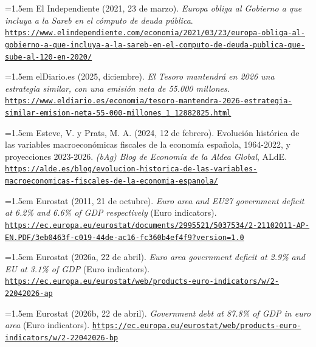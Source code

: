 \documentclass[10pt,a4paper]{article}
\begin{document}
\noindent\hangindent=1.5em El Independiente (2021, 23 de marzo). \textit{Europa obliga al Gobierno a que incluya a la Sareb en el cómputo de deuda pública}. \href{https://www.elindependiente.com/economia/2021/03/23/europa-obliga-al-gobierno-a-que-incluya-a-la-sareb-en-el-computo-de-deuda-publica-que-sube-al-120-en-2020/}{\nolinkurl{https://www.elindependiente.com/economia/2021/03/23/europa-obliga-al-gobierno-a-que-incluya-a-la-sareb-en-el-computo-de-deuda-publica-que-sube-al-120-en-2020/}}

\noindent\hangindent=1.5em elDiario.es (2025, diciembre). \textit{El Tesoro mantendrá en 2026 una estrategia similar, con una emisión neta de 55.000 millones}. \href{https://www.eldiario.es/economia/tesoro-mantendra-2026-estrategia-similar-emision-neta-55-000-millones_1_12882825.html}{\nolinkurl{https://www.eldiario.es/economia/tesoro-mantendra-2026-estrategia-similar-emision-neta-55-000-millones_1_12882825.html}}

\noindent\hangindent=1.5em Esteve, V. y Prats, M. A. (2024, 12 de febrero). Evolución histórica de las variables macroeconómicas fiscales de la economía española, 1964-2022, y proyecciones 2023-2026. \textit{(bAg) Blog de Economía de la Aldea Global}, ALdE. \href{https://alde.es/blog/evolucion-historica-de-las-variables-macroeconomicas-fiscales-de-la-economia-espanola/}{\nolinkurl{https://alde.es/blog/evolucion-historica-de-las-variables-macroeconomicas-fiscales-de-la-economia-espanola/}}

\noindent\hangindent=1.5em Eurostat (2011, 21 de octubre). \textit{Euro area and EU27 government deficit at 6.2\% and 6.6\% of GDP respectively} (Euro indicators). \href{https://ec.europa.eu/eurostat/documents/2995521/5037534/2-21102011-AP-EN.PDF/3eb0463f-c019-44de-ac16-fc360b4ef4f9?version=1.0}{\nolinkurl{https://ec.europa.eu/eurostat/documents/2995521/5037534/2-21102011-AP-EN.PDF/3eb0463f-c019-44de-ac16-fc360b4ef4f9?version=1.0}}

\noindent\hangindent=1.5em Eurostat (2026a, 22 de abril). \textit{Euro area government deficit at 2.9\% and EU at 3.1\% of GDP} (Euro indicators). \href{https://ec.europa.eu/eurostat/web/products-euro-indicators/w/2-22042026-ap}{\nolinkurl{https://ec.europa.eu/eurostat/web/products-euro-indicators/w/2-22042026-ap}}

\noindent\hangindent=1.5em Eurostat (2026b, 22 de abril). \textit{Government debt at 87.8\% of GDP in euro area} (Euro indicators). \href{https://ec.europa.eu/eurostat/web/products-euro-indicators/w/2-22042026-bp}{\nolinkurl{https://ec.europa.eu/eurostat/web/products-euro-indicators/w/2-22042026-bp}}
\end{document}
